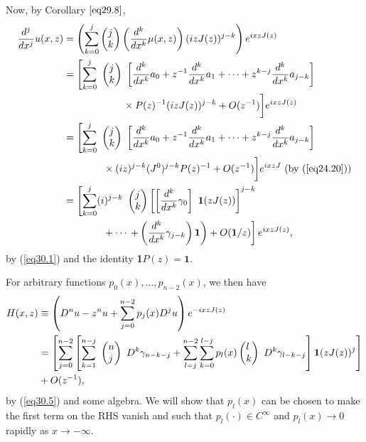 \documentclass{surv-l}
\theoremstyle{plain}
\theoremstyle{definition}
\numberwithin{equation}{chapter}
\begin{document}
Now, by Corollary $\ref{eq29.8}$,
\begin{align}\label{eq30.5}
\frac{d^{j}}{dx^{j}}u(x, z)&=\left(\sum_{k=0}^{j} \left(\begin{array}{@{}l@{}}
j\\
k
\end{array}\right) \left(\frac{d^{k}}{dx^{k}}\mu(x, z)\right)(izJ(z))^{j-k}\right)e^{ixzJ(z)}\\ \nonumber
&=\left[\sum_{k=0}^{j}\ \left(\begin{array}{@{}l@{}}
j\\
k
\end{array}\right)\ \left[\frac{d^{k}}{dx^{k}}a_{0}+z^{-1}\frac{d^{k}}{dx^{k}}a_{1}+\cdots +z^{k-j}\frac{d^{k}}{dx^{k}}a_{j-k}\right]\right.\\ \nonumber
&\qquad\qquad\qquad\times P(z)^{-1}(izJ(z))^{j-k}+O(z^{-1})\bigg]e^{ixzJ(z)}\\ \nonumber
&=\left[\sum_{k=0}^{j}\ \left(\begin{array}{@{}l@{}}
j\\
k
\end{array}\right)\ \left[\frac{d^{k}}{dx^{k}}a_{0}+z^{-1}\frac{d^{k}}{dx^{k}}a_{1}+\cdots +z^{k-j}\frac{d^{k}}{dx^{k}}a_{j-k}\right]\right.\\ \nonumber
& \qquad\quad\quad \times(iz)^{j-k}(J^{0})^{j-k}P(z)^{-1}+O(z^{-1})\bigg]e^{ixzJ} \text{ (by (\ref{eq24.20}))}\\ \nonumber
&=\left[\sum_{k=0}^{j}(i)^{j-k}\ \left(\begin{array}{@{}l@{}}
j\\
k
\end{array}\right) \left[\left[\frac{d^{k}}{dx^{k}}\gamma_{0}\right]\ \mathbf{1} (zJ(z))\right]^{j-k}\right.\\ \nonumber
&\qquad\qquad+\cdots \left.\left.+\left(\frac{d^{k}}{dx^{k}}\gamma_{j-k}\right)\mathbf{1}\right)+O(\mathbf{1}/z)\right]e^{ixzJ(z)},
\end{align}
by (\ref{eq30.1}) and the identity \textbf{1}$P(z)=\textbf{1}$.

For arbitrary functions $ p_{0}(x),\ldots,p_{n-2}(x)$, we then have
\begin{align*}
H(x, z)\displaystyle &\equiv \left(D^{n}u-z^{n}u+\sum_{j=0}^{n-2}p_{j}(x)D^{j}u\right)e^{-ixzJ(z)}\\
&=\left[\sum_{j=0}^{n-2}\left[\sum_{k=1}^{n-j}\ \left(\begin{array}{@{}l@{}}
n\\
j
\end{array}\right)\ D^{k}\gamma_{n-k-j}+\sum_{l=j}^{n-2}\sum_{k=0}^{l-j}p_{l}(x) \left(\begin{array}{@{}l@{}}
l\\
k
\end{array}\right)\ D^{k}\gamma_{l-k-j}\right]\mathbf{1}(zJ(z))^{j}\right]\\
&+O(z^{-1}),
\end{align*}
by (\ref{eq30.5}) and some algebra. We will show that $p_{l}(x)$ can be chosen to make the first term on the RHS vanish and such that $p_{l}(\cdot)\in C^{\infty}$ and $p_{l}(x)\rightarrow 0$ rapidly as $ x\rightarrow-\infty$.
\end{document}
